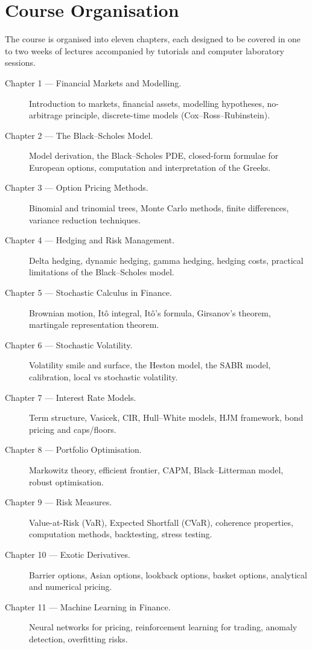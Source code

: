 \section*{Course Organisation}

The course is organised into eleven chapters, each designed to be covered
in one to two weeks of lectures accompanied by tutorials and computer
laboratory sessions.

\begin{description}
    \item[Chapter 1 --- Financial Markets and Modelling.]
        Introduction to markets, financial assets, modelling hypotheses,
        no-arbitrage principle, discrete-time models (Cox--Ross--Rubinstein).

    \item[Chapter 2 --- The Black--Scholes Model.]
        Model derivation, the Black--Scholes PDE, closed-form formulae
        for European options, computation and interpretation of the Greeks.

    \item[Chapter 3 --- Option Pricing Methods.]
        Binomial and trinomial trees, Monte Carlo methods, finite differences,
        variance reduction techniques.

    \item[Chapter 4 --- Hedging and Risk Management.]
        Delta hedging, dynamic hedging, gamma hedging, hedging costs,
        practical limitations of the Black--Scholes model.

    \item[Chapter 5 --- Stochastic Calculus in Finance.]
        Brownian motion, It\^o integral, It\^o's formula, Girsanov's theorem,
        martingale representation theorem.

    \item[Chapter 6 --- Stochastic Volatility.]
        Volatility smile and surface, the Heston model, the SABR model,
        calibration, local vs stochastic volatility.

    \item[Chapter 7 --- Interest Rate Models.]
        Term structure, Vasicek, CIR, Hull--White models, HJM framework,
        bond pricing and caps/floors.

    \item[Chapter 8 --- Portfolio Optimisation.]
        Markowitz theory, efficient frontier, CAPM, Black--Litterman model,
        robust optimisation.

    \item[Chapter 9 --- Risk Measures.]
        Value-at-Risk (VaR), Expected Shortfall (CVaR), coherence properties,
        computation methods, backtesting, stress testing.

    \item[Chapter 10 --- Exotic Derivatives.]
        Barrier options, Asian options, lookback options, basket options,
        analytical and numerical pricing.

    \item[Chapter 11 --- Machine Learning in Finance.]
        Neural networks for pricing, reinforcement learning for trading,
        anomaly detection, overfitting risks.
\end{description}

